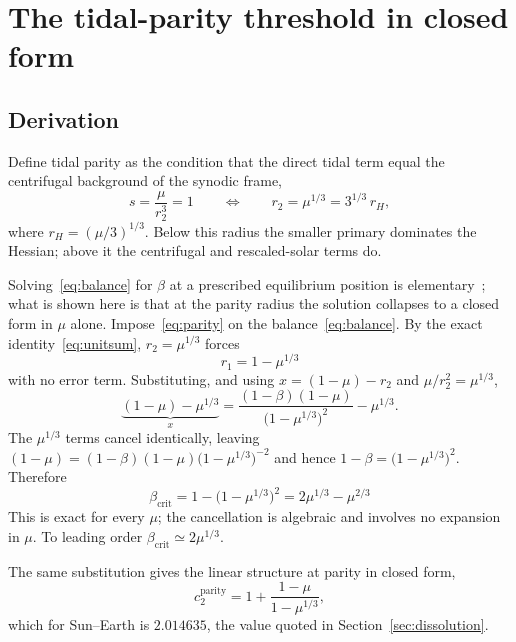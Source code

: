 \documentclass[pdflatex,sn-mathphys-num]{sn-jnl}
\begin{document}
\section{The tidal-parity threshold in closed form}\label{sec:closed}

\subsection{Derivation}

Define tidal parity as the condition that the direct tidal term equal the
centrifugal background of the synodic frame,
\begin{equation}
  s = \frac{\mu}{r_2^{3}} = 1
  \qquad\Longleftrightarrow\qquad
  r_2 = \mu^{1/3} = 3^{1/3}\,r_H ,
  \label{eq:parity}
\end{equation}
where $r_H=(\mu/3)^{1/3}$. Below this radius the smaller primary dominates the
Hessian; above it the centrifugal and rescaled-solar terms do.

Solving~\eqref{eq:balance} for $\beta$ at a prescribed equilibrium position is
elementary~\cite{mcinnes1994,mcinnes1999}; what is shown here is that at the
parity radius the solution collapses to a closed form in $\mu$ alone.
Impose~\eqref{eq:parity} on the balance~\eqref{eq:balance}. By the exact
identity~\eqref{eq:unitsum}, $r_2=\mu^{1/3}$ forces
\begin{equation}
  r_1 = 1-\mu^{1/3}
\end{equation}
with no error term. Substituting, and using $x=(1-\mu)-r_2$ and
$\mu/r_2^{2}=\mu^{1/3}$,
\begin{equation}
  \underbrace{(1-\mu)-\mu^{1/3}}_{x}
  = \frac{(1-\beta)(1-\mu)}{\bigl(1-\mu^{1/3}\bigr)^{2}} - \mu^{1/3} .
\end{equation}
The $\mu^{1/3}$ terms cancel identically, leaving
$(1-\mu)=(1-\beta)(1-\mu)\bigl(1-\mu^{1/3}\bigr)^{-2}$ and hence
$1-\beta=\bigl(1-\mu^{1/3}\bigr)^{2}$. Therefore
\begin{equation}
  \boxed{\;
  \beta_{\mathrm{crit}} = 1-\bigl(1-\mu^{1/3}\bigr)^{2}
                        = 2\mu^{1/3}-\mu^{2/3}
  \;}
  \label{eq:closed}
\end{equation}
This is exact for every $\mu$; the cancellation is algebraic and involves no
expansion in $\mu$. To leading order $\beta_{\mathrm{crit}}\simeq2\mu^{1/3}$.

The same substitution gives the linear structure at parity in closed form,
\begin{equation}
  c_2^{\mathrm{parity}} = 1 + \frac{1-\mu}{1-\mu^{1/3}} ,
  \label{eq:Aparity}
\end{equation}
which for Sun--Earth is $2.014635$, the value quoted in
Section~\ref{sec:dissolution}.
\end{document}
